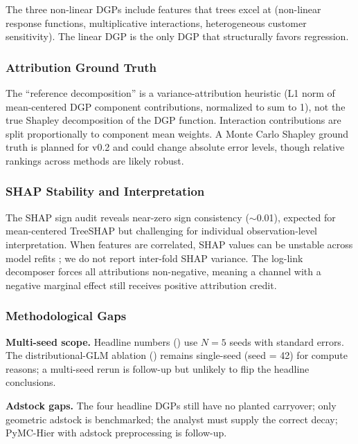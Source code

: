 \documentclass[review,12pt]{elsarticle}
\begin{document}
The three non-linear DGPs include features that trees excel at (non-linear
response functions, multiplicative interactions, heterogeneous customer
sensitivity). The linear DGP is the only DGP that structurally favors
regression.

\subsubsection{Attribution Ground Truth}
\label{sec:limits:groundtruth}

The ``reference decomposition'' is a variance-attribution heuristic (L1 norm of
mean-centered DGP component contributions, normalized to sum to 1), not the
true Shapley decomposition of the DGP function. Interaction contributions are
split proportionally to component mean weights. A Monte Carlo Shapley ground
truth is planned for v0.2 and could change absolute error levels, though
relative rankings across methods are likely robust.

\subsubsection{SHAP Stability and Interpretation}
\label{sec:limits:shap}

The SHAP sign audit reveals near-zero sign consistency ($\sim$0.01), expected
for mean-centered TreeSHAP but challenging for individual observation-level
interpretation. When features are correlated, SHAP values can be unstable
across model refits \cite{sundararajan2020many}; we do not report inter-fold
SHAP variance. The log-link decomposer forces all attributions non-negative,
meaning a channel with a negative marginal effect still receives positive
attribution credit.

\subsubsection{Methodological Gaps}
\label{sec:limits:methods}

\textbf{Multi-seed scope.} Headline numbers () use $N{=}5$
seeds with standard errors. The distributional-GLM ablation ()
remains single-seed (seed = 42) for compute reasons; a multi-seed rerun is
follow-up but unlikely to flip the headline conclusions.

\textbf{Adstock gaps.} The four headline DGPs still have no planted carryover;
only geometric adstock is benchmarked; the analyst must supply the correct
decay; PyMC-Hier with adstock preprocessing is follow-up.
\end{document}
